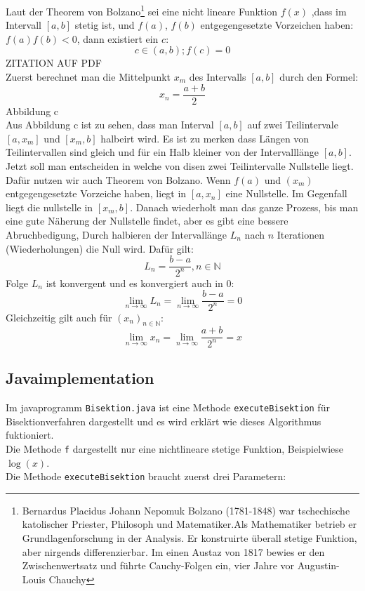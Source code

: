 Laut der Theorem von Bolzano\footnote{Bernardus Placidus Johann Nepomuk Bolzano (1781-1848) war tschechische katolischer Priester, Philosoph und Matematiker.Als Mathematiker betrieb er Grundlagenforschung in der Analysis. Er konstruirte überall stetige Funktion, aber nirgends differenzierbar.
Im einen Austaz von 1817 bewies er den Zwischenwertsatz und führte Cauchy-Folgen ein, vier Jahre vor Augustin- Louis Chauchy} sei eine nicht lineare  Funktion $f(x)$ ,dass im Intervall $[a,b]$ stetig ist,  
und  $f(a)$, $f(b)$ entgegengesetzte Vorzeichen haben: $f(a)f(b)<0$, dann existiert ein $c$:
$$c \in (a,b) ; f(c)=0$$  ZITATION AUF PDF\\
Zuerst berechnet man die Mittelpunkt $x_m$ des Intervalls $[a,b]$ durch den Formel:
$$ x_n = \frac{a+b}{2}$$
Abbildung c
\\
Aus Abbildung c ist zu sehen, dass man Interval $[a,b]$ auf zwei Teilintervale $[a,x_m]$ und $[x_m,b]$ halbeirt wird. Es ist zu merken dass Längen von Teilintervallen sind gleich und für ein Halb kleiner von der Intervalllänge $[a,b]$. 
Jetzt soll man entscheiden in welche von disen zwei Teilintervalle Nullstelle liegt. Dafür nutzen wir auch Theorem von Bolzano. 
Wenn $f(a)$ und $(x_m)$ entgegengesetzte Vorzeiche haben, liegt in $[a,x_n]$ eine Nullstelle. Im Gegenfall liegt die nullstelle in $[x_m,b]$.
Danach wiederholt man das ganze  Prozess, bis man eine gute Näherung der Nullstelle findet, aber es gibt eine bessere Abruchbedigung, Durch halbieren der Intervallänge $L_n$ nach $n$ Iterationen (Wiederholungen) die Null wird. Dafür gilt:
$$L_n = \frac{b-a}{2^n}, n \in \mathbb{N}$$ Folge $L_n$ ist konvergent und es konvergiert auch in 0:
$$\lim_{n \to \infty}L_n = \lim_{n \to \infty}\frac{b-a}{2^n}=0$$
Gleichzeitig gilt auch für $(x_n)_{n \in \mathbb{N}}$:
$$\lim_{n \to \infty} x_n =\lim_{n \to \infty}\frac{a+b}{2^n} =x$$

\subsection{Javaimplementation}
Im javaprogramm \verb|Bisektion.java| ist eine Methode \verb|executeBisektion| für Bisektionverfahren dargestellt und es wird erklärt wie dieses Algorithmus fuktioniert.\\
Die Methode \verb|f| dargestellt nur eine nichtlineare stetige Funktion, Beispielwiese $\log(x)$.
\\
Die Methode \verb|executeBisektion| braucht zuerst drei Parametern:

